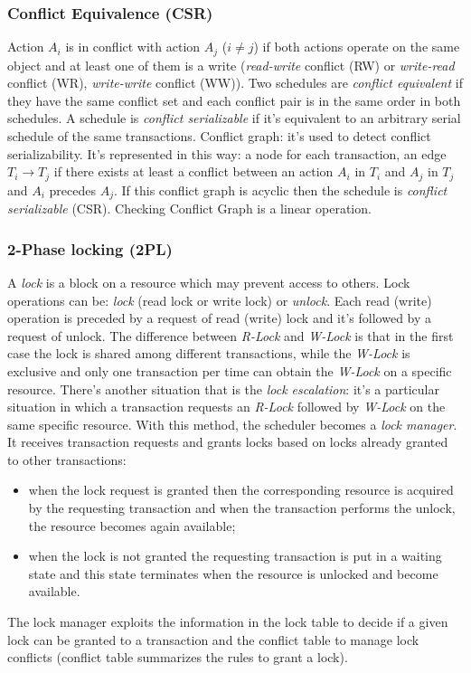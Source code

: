 \subsubsection{Conflict Equivalence (CSR)}
Action $A_i$ is in conflict with action $A_j$ ($i \neq j$) if both actions operate on the same object and at least one of them is a write (\emph{read-write} conflict (RW) or \emph{write-read} conflict (WR), \emph{write-write} conflict
(WW)).
Two schedules are \emph{conflict equivalent} if they have the same conflict set and each conflict pair is in the same order in both schedules.
A schedule is \emph{conflict serializable} if it's equivalent to an arbitrary serial schedule of the same transactions.
Conflict graph: it's used to detect conflict serializability.
It's represented in this way: a node for each transaction, an edge $T_i \to T_j$ if there exists at least a conflict between an action $A_i$ in $T_i$ and $A_j$ in $T_j$ and $A_i$ precedes $A_j$.
If this conflict graph is acyclic then the schedule is \emph{conflict serializable} (CSR).
Checking Conflict Graph is a linear operation.

\subsubsection{2-Phase locking (2PL)}
A \emph{lock} is a block on a resource which may prevent access to others.
Lock operations can be: \emph{lock} (read lock or write lock) or \emph{unlock}.
Each read (write) operation is preceded by a request of read (write) lock and it's followed by a request of unlock.
The difference between \emph{R-Lock} and \emph{W-Lock} is that in the first case the lock is shared among different transactions, while the \emph{W-Lock} is exclusive and only one transaction per time can obtain the \emph{W-Lock} on a specific resource.
There's another situation that is the \emph{lock escalation}: it's a particular situation in which a transaction requests an \emph{R-Lock} followed by \emph{W-Lock} on the same specific resource.
With this method, the scheduler becomes a \emph{lock manager}.
It receives transaction requests and grants locks based on locks already granted to other transactions:
\begin{itemize}
	\item when the lock request is granted then the corresponding resource is acquired by the requesting transaction and when the transaction performs the unlock, the resource becomes again available;
	\item when the lock is not granted the requesting transaction is put in a waiting state and this state terminates when the resource is unlocked and become available.
\end{itemize}
The lock manager exploits the information in the lock table to decide if a given lock can be granted to a transaction and the conflict table to manage lock conflicts (conflict table summarizes the rules to grant a lock).

